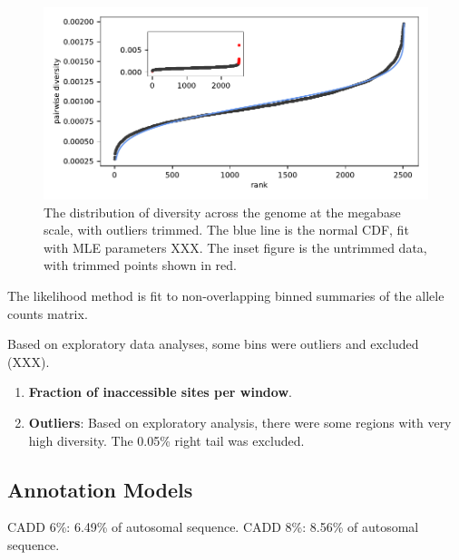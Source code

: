 \documentclass[11pt]{article}
\begin{document}
\begin{figure}[!htb]
  \centering
  \includegraphics{figures/supplementary/diversity_trimming_dist.pdf}

  \caption{The distribution of diversity across the genome at the megabase
  scale, with outliers trimmed. The blue line is the normal CDF, fit with MLE
parameters XXX. The inset figure is the untrimmed data, with trimmed points
shown in red.}

  \label{suppfig:trimming}
\end{figure}


The likelihood method is fit to non-overlapping binned summaries of the allele
counts matrix. 


Based on exploratory data analyses, some bins were outliers and
excluded (XXX). 



\begin{enumerate}
  \item \textbf{Fraction of inaccessible sites per window}.  

  \item \textbf{Outliers}: Based on exploratory analysis, there were some
    regions with very high diversity. The 0.05\% right tail was excluded.

\end{enumerate}



\subsection{Annotation Models}


CADD 6\%: 6.49\% of autosomal sequence.
CADD 8\%: 8.56\% of autosomal sequence.
\end{document}
